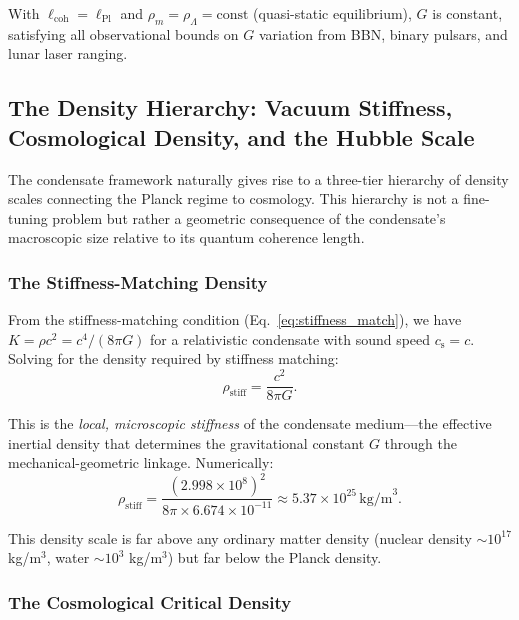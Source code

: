 \documentclass[11pt,a4paper]{article}
\newcommand{\cs}{c_{\mathrm{s}}}
\newcommand{\rhostiff}{\rho_{\mathrm{stiff}}}
\theoremstyle{definition}
\begin{document}
With $\ell_{\mathrm{coh}} = \ell_{\mathrm{Pl}}$ and $\rho_m = \rho_\Lambda = \text{const}$ (quasi-static equilibrium), $G$ is constant, satisfying all observational bounds on $G$ variation from BBN, binary pulsars, and lunar laser ranging.

\subsection{The Density Hierarchy: Vacuum Stiffness, Cosmological Density, and the Hubble Scale}
\label{sec:density_hierarchy}

The condensate framework naturally gives rise to a three-tier hierarchy of density scales connecting the Planck regime to cosmology. This hierarchy is not a fine-tuning problem but rather a geometric consequence of the condensate's macroscopic size relative to its quantum coherence length.

\subsubsection{The Stiffness-Matching Density}
\label{sec:stiffness_density}

From the stiffness-matching condition (Eq.~\ref{eq:stiffness_match}), we have $K = \rho c^2 = c^4/(8\pi G)$ for a relativistic condensate with sound speed $\cs = c$. Solving for the density required by stiffness matching:
\begin{equation}
\label{eq:rho_stiff}
\rhostiff = \frac{c^2}{8\pi G}.
\end{equation}

This is the \emph{local, microscopic stiffness} of the condensate medium---the effective inertial density that determines the gravitational constant $G$ through the mechanical-geometric linkage. Numerically:
\begin{equation}
\label{eq:rho_stiff_value}
\rhostiff = \frac{(2.998 \times 10^{8})^2}{8\pi \times 6.674 \times 10^{-11}} \approx 5.37 \times 10^{25} \, \text{kg/m}^3.
\end{equation}

This density scale is far above any ordinary matter density (nuclear density $\sim 10^{17}$ kg/m$^3$, water $\sim 10^{3}$ kg/m$^3$) but far below the Planck density.

\subsubsection{The Cosmological Critical Density}
\label{sec:critical_density}
\end{document}
